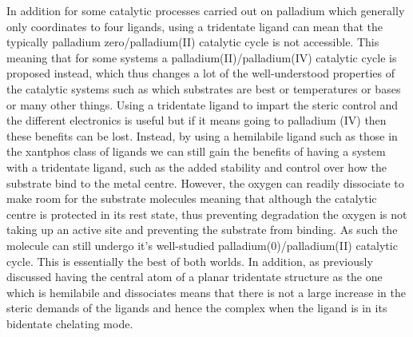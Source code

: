 In addition for some catalytic processes carried out on palladium which generally only coordinates to four ligands, using a tridentate ligand can mean that the typically palladium zero/palladium(II) catalytic cycle is not accessible.  This meaning that for some systems a palladium(II)/palladium(IV) catalytic cycle is proposed instead, which thus changes a lot of the well-understood properties of the catalytic systems such as which substrates are best or temperatures or bases or many other things.  Using a tridentate ligand to impart the steric control and the different electronics is useful but if it means going to palladium (IV) then these benefits can be lost.  Instead, by using a hemilabile ligand such as those in the xantphos class of ligands we can still gain the benefits of having a system with a tridentate ligand, such as the added stability and control over how the substrate bind to the metal centre.  However, the oxygen can readily dissociate to make room for the substrate molecules meaning that although the catalytic centre is protected in its rest state, thus preventing degradation the oxygen is not taking up an active site and preventing the substrate from binding.  As such the molecule can still undergo it's well-studied palladium(0)/palladium(II) catalytic cycle.  This is essentially the best of both worlds.  In addition, as previously discussed having the central atom of a planar tridentate structure as the one which is hemilabile and dissociates means that there is not a large increase in the steric demands of the ligands and hence the complex when the ligand is in its bidentate chelating mode.  

